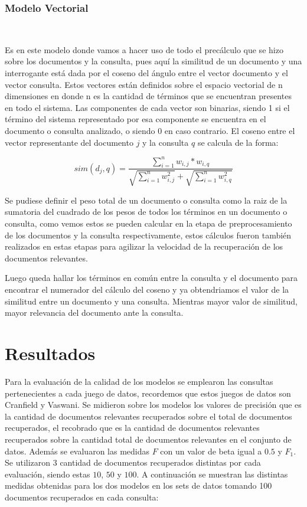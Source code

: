 \documentclass{llncs}
\begin{document}
\subsubsection{Modelo Vectorial}\

Es en este modelo donde vamos a hacer uso de todo el precálculo que se hizo sobre los documentos y la consulta, pues aquí la similitud de un documento y una interrogante está dada por el coseno del ángulo entre el vector documento y el vector consulta. Estos vectores están definidos sobre el espacio vectorial de n dimensiones en donde n es la cantidad de términos que se encuentran presentes en todo el sistema. Las componentes de cada vector son binarias, siendo 1 si el término del sistema representado por esa componente se encuentra en el documento o consulta analizado, o siendo 0 en caso contrario. El coseno entre el vector representante del documento $j$ y la consulta $q$ se calcula de la forma:

\begin{equation}
    sim(d_j, q) = \frac{\sum_{i = 1}^n w_{i, j} * w_{i, q}}{\sqrt{\sum_{i = 1}^n w^2_{i, j}} + \sqrt{\sum_{i = 1}^n w^2_{i, q}}}
\end{equation}

Se pudiese definir el peso total de un documento o consulta como la raiz de la sumatoria del cuadrado de los pesos de todos los términos en un documento o consulta, como vemos estos se pueden calcular en la etapa de preprocesamiento de los documentos y la consulta respectivamente, estos cálculos fueron también realizados en estas etapas para agilizar la velocidad de la recuperación de los documentos relevantes.

Luego queda hallar los términos en común entre la consulta y el documento para encontrar el numerador del cálculo del coseno y ya obtendriamos el valor de la similitud entre un documento y una consulta. Mientras mayor valor de similitud, mayor relevancia del documento ante la consulta.

\section{Resultados}

Para la evaluación de la calidad de los modelos se emplearon las consultas pertenecientes a cada juego de datos, recordemos que estos juegos de datos son Cranfield y Vaswani. Se midieron sobre los modelos los valores de precisión que es la cantidad de documentos relevantes recuperados sobre el total de documentos recuperados, el recobrado que es la cantidad de documentos relevantes recuperados sobre la cantidad total de documentos relevantes en el conjunto de datos. Además se evaluaron las medidas $F$ con un valor de beta igual a $0.5$ y $F_1$. Se utilizaron 3 cantidad de documentos recuperados distintas por cada evaluación, siendo estas $10$, $50$ y $100$. A continuación se muestran las distintas medidas obtenidas para los dos modelos en los sets de datos tomando 100 documentos recuperados en cada consulta:
\end{document}
